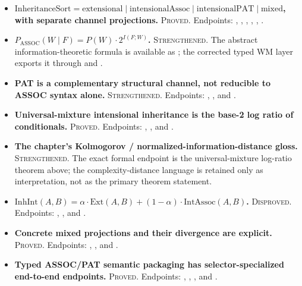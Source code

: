 \documentclass[11pt,openany]{report}
\begin{document}
\begin{itemize}
\item \textbf{$\mathrm{InheritanceSort} = \mathrm{extensional} \mid
  \mathrm{intensionalAssoc} \mid \mathrm{intensionalPAT} \mid \mathrm{mixed}$,
  with separate channel projections.} \textsc{Proved}.  Endpoints:
  , ,
  , ,
  , .
\item \textbf{$P_{\mathrm{ASSOC}}(W \mid F) = P(W) \cdot 2^{I(F;W)}$.}
  \textsc{Strengthened}.  The abstract information-theoretic formula is
  available as ; the corrected typed WM layer
  exports it through  and
  .
\item \textbf{PAT is a complementary structural channel, not reducible to
  ASSOC syntax alone.} \textsc{Strengthened}.  Endpoints:
  ,
  , and
  .
\item \textbf{Universal-mixture intensional inheritance is the
  base-2 log ratio of conditionals.} \textsc{Proved}.  Endpoints:
  ,
  , and
  .
\item \textbf{The chapter's Kolmogorov / normalized-information-distance gloss.}
  \textsc{Strengthened}.  The exact formal endpoint is the
  universal-mixture log-ratio theorem above; the complexity-distance
  language is retained only as interpretation, not as the primary
  theorem statement.
\item \textbf{$\mathrm{InhInt}(A, B) = \alpha \cdot \mathrm{Ext}(A, B) +
  (1 - \alpha) \cdot \mathrm{IntAssoc}(A, B)$.} \textsc{Disproved}.
  Endpoints: ,
  , and
  .
\item \textbf{Concrete mixed projections and their divergence are explicit.}
  \textsc{Proved}.  Endpoints:
  ,
  , and
  .
\item \textbf{Typed ASSOC/PAT semantic packaging has selector-specialized
  end-to-end endpoints.} \textsc{Proved}.  Endpoints:
  ,
  ,
  , and
  .
\end{itemize}
\end{document}
